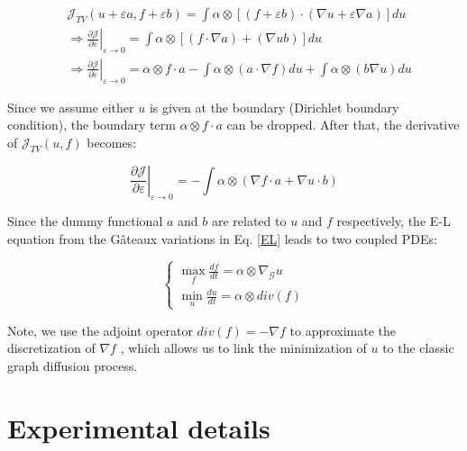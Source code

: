 \documentclass{article}
\begin{document}
\begin{equation}
    \begin{aligned}
& \mathcal{J}_{T V}(u+\varepsilon a, f+\varepsilon b)=\int \alpha \otimes [(f+\varepsilon b) \cdot(\nabla u+\varepsilon \nabla a)] d u \\
& \left.\left.\Rightarrow \frac{\partial \mathcal{J}}{\partial \varepsilon}\right|_{\varepsilon \rightarrow 0}=\int \alpha \otimes [(f \cdot \nabla a) +(\nabla u b)]\right. d u \\
& \left.\Rightarrow \frac{\partial \mathcal{J}}{\partial \varepsilon}\right|_{\varepsilon \rightarrow 0} = \alpha  \otimes f \cdot a - \int {\alpha  \otimes (a \cdot \nabla f)du}  + \int {\alpha  \otimes (b\nabla u)du}
\end{aligned}
\end{equation}

Since we assume either $u$ is given at the boundary (Dirichlet boundary condition), the boundary term $\alpha  \otimes f \cdot a$ can be dropped. After that, the derivative of
$\mathcal{J}_{TV}(u,f)$ becomes:

\begin{equation}
\label{EL}
\left.\frac{\partial \mathcal{J}}{\partial \varepsilon}\right|_{\varepsilon \rightarrow 0}=-\int  \alpha \otimes (\nabla f \cdot a+\nabla u \cdot b)
\end{equation}

Since the dummy functional $a$ and $b$ are related to $u$ and $f$ respectively, the E-L equation from the Gâteaux variations in Eq. \ref{EL} leads to two coupled PDEs:

\begin{equation}
\label{dual2}
\left\{ {\begin{array}{*{20}{c}}
{\mathop {\max }\limits_f \frac{{df}}{{dt}} = {\alpha \otimes \nabla _\mathcal{G}}u}\\
{\mathop {\min }\limits_u \frac{{du}}{{dt}} = \alpha \otimes div(f)}
\end{array}} \right.
\end{equation}

Note, we use the adjoint operator $div(f) = - \nabla f$ to approximate the discretization of $\nabla f$ \cite{hyman1997adjoint}, which allows us to link the minimization of $u$ to the classic graph diffusion process.

\section{Experimental details}
\label{s2}
\end{document}
